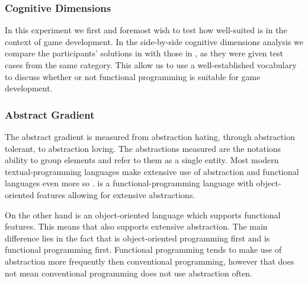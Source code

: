 \subsubsection{Cognitive Dimensions}
In this experiment we first and foremost wish to test how well-suited \fsh is in the context of game development. In the side-by-side cognitive dimensions analysis we compare the participants' solutions in \fsh with those in \csh, as they were given test cases from the same category. This allow us to use a well-established vocabulary to discuss whether or not functional programming is suitable for game development.


\subsubsection{Abstract Gradient}
The abstract gradient is measured from abstraction hating, through abstraction tolerant, to abstraction loving. The abstractions measured are the notations ability to group elements and refer to them as a single entity. Most modern textual-programming languages make extensive use of abstraction and functional languages even more so \cite{hudak1989conception}. \fs is a functional-programming language with object-oriented features allowing for extensive abstractions.

On the other hand \cs is an object-oriented language which supports functional features. This means that \cs also supports extensive abstraction. The main difference lies in the fact that \cs is object-oriented programming first and \fs is functional programming first. Functional programming tends to make use of abstraction more frequently then conventional programming, however that does not mean conventional programming does not use abstraction often.

